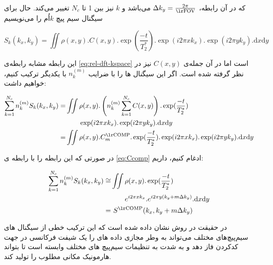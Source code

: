 که در آن رابطه، $\Delta k_y = \frac{2\pi}{\lrtext{FOV}}$
می‌باشد و $k$ نیز بین 1 تا $N_c$ تغییر می‌کند.
حال برای سیگنال سیم پیچ $k$اُم را می‌نویسیم


\removevspace
\begin{equation}
	S_k(k_x, k_y) = \iint \rho(x,y) . C(x,y) . \exp(\frac{-t}{T_2^*}) . \exp(i2\pi x k_x) .\exp(i2\pi y k_y) . \mathrm{d}x \mathrm{d}y
\end{equation}

این رابطه مشابه رابطه‌ی \ref{eq:rel-dft-kspace}
است اما در آن جمله‌ی $C(x,y)$ نیز در نظر گرفته شده است. اگر این سیگنال ها را با ضرایب  $n_k^{(m)}$
با یکدیگر ترکیب کنیم، خواهیم داشت:


\removevspace
\begin{equation}
\begin{aligned}
	\sum_{k=1}^{N_c} n_k^{(m)} S_k(k_x, k_y) =&  \iint  \rho(x,y) . \left(n_k^{(m)}  \sum_{k=1}^{N_c} C(x,y) \right) . \exp(\frac{-t}{T_2^*}) \\
	&\qquad \exp(i2\pi x k_x) . \exp(i2\pi y k_y) . \mathrm{d}x \mathrm{d}y \\
	 =& \iint  \rho(x,y) . C_m^{\lrtext{COMP}} . \exp(\frac{-t}{T_2^*}) .\exp(i2\pi x k_x) . \exp(i2\pi y k_y) . \mathrm{d}x \mathrm{d}y 
\end{aligned}
\end{equation}


در صورتی که این رابطه را با رابطه ی \ref{eq:Ccomp}
ادغام کنیم، داریم:




\removevspace
\begin{equation}
	\begin{aligned}
		\sum_{k=1}^{N_c} n_k^{(m)} S_k(k_x, k_y) \cong& \iint  \rho(x,y) . \exp(\frac{-t}{T_2^*}) \\
		&\qquad e^{i2\pi x k_x} . e^{i2\pi y (k_y + m\Delta k_y)} . \mathrm{d}x \mathrm{d}y \\
		=&\ S^{\lrtext{COMP}}(k_x, k_y + m \Delta k_y)
	\end{aligned}
\end{equation}


در حقیقت در روش  نشان داده شده است که این ترکیب خطی از سیگنال های سیم‌پیچ‌های مختلف می‌تواند به وطر مجازی داده های \kspace 
را یک شیفت فرکانسی در جهت کدکردن فاز دهد و به شدت به تنظیمات سیم‌پیچ های مختلف وابسته است تا بتواند هارمونیک مکانی مطلوب را تولید کند.





\FloatBarrier
